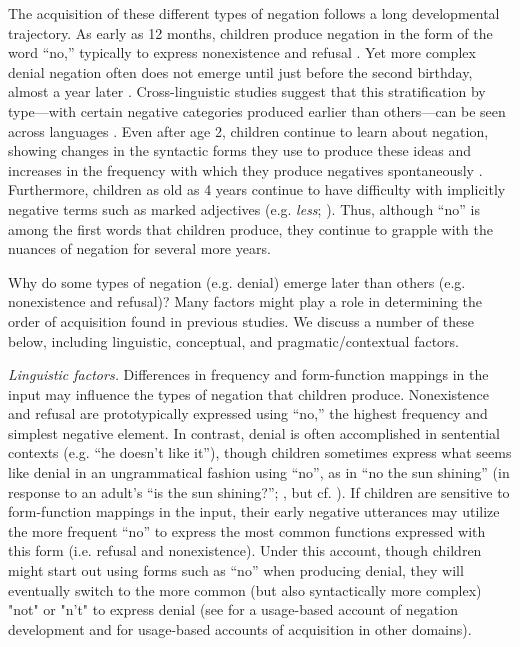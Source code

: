\documentclass[man]{apa2}
\begin{document}
The acquisition of these different types of negation follows a long developmental trajectory. As early as 12 months, children produce negation in the form of the word ``no,'' typically to express nonexistence and refusal \cite{bloom1970, bloom1993, pea1980}.  Yet more complex denial negation often does not emerge until just before the second birthday, almost a year later \cite{pea1980}.  Cross-linguistic studies suggest that this stratification by type---with certain negative categories produced earlier than others---can be seen across languages \cite{mcneill1968}.  
Even after age 2, children continue to learn about negation, showing changes in the syntactic forms they use to produce these ideas \cite{klima1966, cameron2007} and increases in the frequency with which they produce negatives spontaneously \cite{pea1982}.   Furthermore, children as old as 4 years continue to have difficulty with implicitly negative terms such as marked adjectives (e.g. \emph{less}; ).  Thus, although ``no'' is among the first words that children produce, they continue to grapple with the nuances of negation for several more years.  

Why do some types of negation (e.g. denial) emerge later than others (e.g. nonexistence and refusal)? Many factors might play a role in determining the order of acquisition found in previous studies. We discuss a number of these below, including linguistic, conceptual, and pragmatic/contextual factors.

{\it Linguistic factors.} Differences in frequency and form-function mappings in the input may influence the types of negation that children produce.  Nonexistence and refusal are prototypically expressed using ``no,'' the highest frequency and simplest negative element. In contrast, denial is often accomplished in sentential contexts (e.g. ``he doesn't like it''), though children sometimes express what seems like denial in an ungrammatical fashion using ``no'', as in ``no the sun shining'' (in response to an adult's ``is the sun shining?''; , but cf. ).  If children are sensitive to form-function mappings in the input, their early negative utterances may utilize the more frequent ``no'' to express the most common functions expressed with this form (i.e. refusal and nonexistence).  Under this account, though children might start out using forms such as ``no'' when producing denial, they will eventually switch to the more common (but also syntactically more complex) "not" or "n't" to express denial (see  for a usage-based account of negation development and  for usage-based accounts of acquisition in other domains).  
\end{document}
